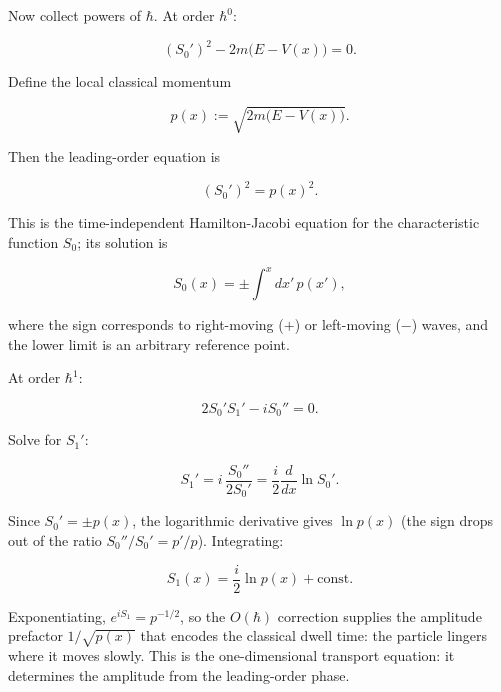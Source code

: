 Now collect powers of $\hbar$. At order $\hbar^0$:
\begin{linenomath}
\begin{equation*}
(S_0')^2 - 2m\bigl(E - V(x)\bigr) = 0.
\end{equation*}
\end{linenomath}
Define the local classical momentum
\begin{linenomath}
\begin{equation*}
p(x) := \sqrt{2m\bigl(E - V(x)\bigr)}.
\end{equation*}
\end{linenomath}
Then the leading-order equation is
\begin{linenomath}
\begin{equation}
(S_0')^2 = p(x)^2.
\label{eq:wkb-leading}
\end{equation}
\end{linenomath}
This is the time-independent Hamilton-Jacobi equation for the characteristic function $S_0$; its solution is
\begin{linenomath}
\begin{equation*}
S_0(x) = \pm\int^x dx'\,p(x'),
\end{equation*}
\end{linenomath}
where the sign corresponds to right-moving ($+$) or left-moving ($-$) waves, and the lower limit is an arbitrary reference point.

At order $\hbar^1$:
\begin{linenomath}
\begin{equation}
2S_0' S_1' - i S_0'' = 0.
\label{eq:wkb-next-order}
\end{equation}
\end{linenomath}
Solve for $S_1'$:
\begin{linenomath}
\begin{equation*}
S_1' = i\,\frac{S_0''}{2S_0'} = \frac{i}{2}\frac{d}{dx}\ln S_0'.
\end{equation*}
\end{linenomath}
Since $S_0' = \pm p(x)$, the logarithmic derivative gives $\ln p(x)$ (the sign drops out of the ratio $S_0''/S_0' = p'/p$). Integrating:
\begin{linenomath}
\begin{equation*}
S_1(x) = \frac{i}{2}\ln p(x) + \text{const}.
\end{equation*}
\end{linenomath}
Exponentiating, $e^{iS_1} = p^{-1/2}$, so the $O(\hbar)$ correction supplies the amplitude prefactor $1/\sqrt{p(x)}$ that encodes the classical dwell time: the particle lingers where it moves slowly. This is the one-dimensional transport equation: it determines the amplitude from the leading-order phase.

